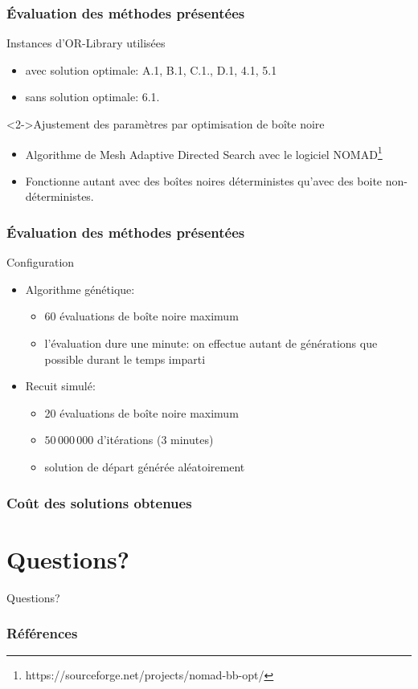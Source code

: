 \documentclass[aspectratio=169,11pt]{beamer}
\begin{document}
	\begin{frame}
		\frametitle{Évaluation des méthodes présentées}
		\begin{block}{Instances d'OR-Library utilisées}
			\begin{itemize}
				\item avec solution optimale: A.1, B.1, C.1., D.1, 4.1, 5.1
				\item sans solution optimale: 6.1.
			\end{itemize}
		\end{block}
		\begin{block}<2->{Ajustement des paramètres par optimisation de boîte noire}
			\begin{itemize}
				\item Algorithme de Mesh Adaptive Directed Search avec le logiciel NOMAD\footnote{{https://sourceforge.net/projects/nomad-bb-opt/}}
				\item Fonctionne autant avec des boîtes noires déterministes qu'avec des boite non-déterministes.
			\end{itemize}
		\end{block}
	\end{frame}
	\begin{frame}
		\frametitle{Évaluation des méthodes présentées}
		\begin{block}{Configuration}
			\begin{itemize}
				\item Algorithme génétique:
					\begin{itemize}
						\item 60 évaluations de boîte noire maximum
						\item l'évaluation dure une minute: on effectue autant de générations que possible durant le temps imparti
					\end{itemize}
				\item Recuit simulé:
					\begin{itemize}
						\item 20 évaluations de boîte noire maximum
						\item \(50\,000\,000\) d'itérations (3 minutes)
						\item solution de départ générée aléatoirement
					\end{itemize}
			\end{itemize}
		\end{block}
	\end{frame}

	\begin{frame}
		\frametitle{Coût des solutions obtenues}
		\centering
		
	\end{frame}

	\section*{Questions?}
		\begin{frame}[focus]
			Questions?
		\end{frame}
	\appendix
		\begin{frame}[t,allowframebreaks]
			\frametitle{Références}
			\printbibliography[heading=bibintoc]{}
		\end{frame}
\end{document}
